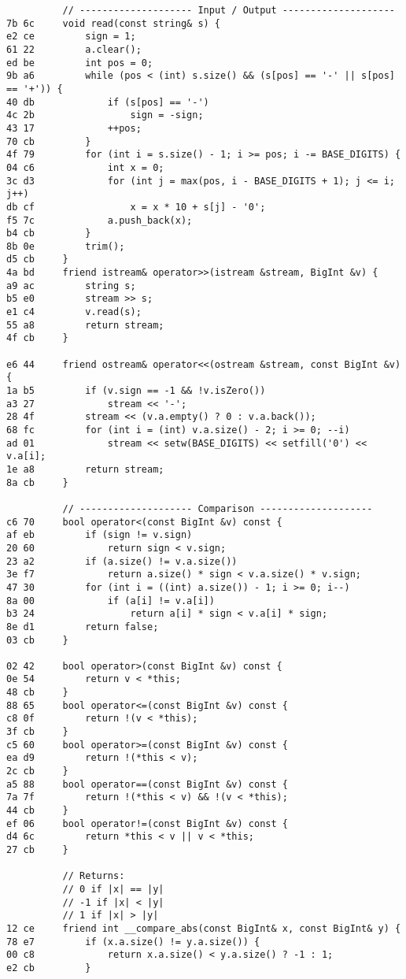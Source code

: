 \documentclass[11pt, a4paper, twoside]{article}
\begin{document}
\begin{lstlisting}
          // -------------------- Input / Output --------------------
7b 6c     void read(const string& s) {
e2 ce         sign = 1;
61 22         a.clear();
ed be         int pos = 0;
9b a6         while (pos < (int) s.size() && (s[pos] == '-' || s[pos] == '+')) {
40 db             if (s[pos] == '-')
4c 2b                 sign = -sign;
43 17             ++pos;
70 cb         }
4f 79         for (int i = s.size() - 1; i >= pos; i -= BASE_DIGITS) {
04 c6             int x = 0;
3c d3             for (int j = max(pos, i - BASE_DIGITS + 1); j <= i; j++)
db cf                 x = x * 10 + s[j] - '0';
f5 7c             a.push_back(x);
b4 cb         }
8b 0e         trim();
d5 cb     }
4a bd     friend istream& operator>>(istream &stream, BigInt &v) {
a9 ac         string s;
b5 e0         stream >> s;
e1 c4         v.read(s);
55 a8         return stream;
4f cb     }
      
e6 44     friend ostream& operator<<(ostream &stream, const BigInt &v) {
1a b5         if (v.sign == -1 && !v.isZero())
a3 27             stream << '-';
28 4f         stream << (v.a.empty() ? 0 : v.a.back());
68 fc         for (int i = (int) v.a.size() - 2; i >= 0; --i)
ad 01             stream << setw(BASE_DIGITS) << setfill('0') << v.a[i];
1e a8         return stream;
8a cb     }
      
          // -------------------- Comparison --------------------
c6 70     bool operator<(const BigInt &v) const {
af eb         if (sign != v.sign)
20 60             return sign < v.sign;
23 a2         if (a.size() != v.a.size())
3e f7             return a.size() * sign < v.a.size() * v.sign;
47 30         for (int i = ((int) a.size()) - 1; i >= 0; i--)
8a 00             if (a[i] != v.a[i])
b3 24                 return a[i] * sign < v.a[i] * sign;
8e d1         return false;
03 cb     }
      
02 42     bool operator>(const BigInt &v) const {
0e 54         return v < *this;
48 cb     }
88 65     bool operator<=(const BigInt &v) const {
c8 0f         return !(v < *this);
3f cb     }
c5 60     bool operator>=(const BigInt &v) const {
ea d9         return !(*this < v);
2c cb     }
a5 88     bool operator==(const BigInt &v) const {
7a 7f         return !(*this < v) && !(v < *this);
44 cb     }
ef 06     bool operator!=(const BigInt &v) const {
d4 6c         return *this < v || v < *this;
27 cb     }
      
          // Returns:
          // 0 if |x| == |y|
          // -1 if |x| < |y|
          // 1 if |x| > |y|
12 ce     friend int __compare_abs(const BigInt& x, const BigInt& y) {
78 e7         if (x.a.size() != y.a.size()) {
00 c8             return x.a.size() < y.a.size() ? -1 : 1;
e2 cb         }
      

\end{lstlisting}
\end{document}
